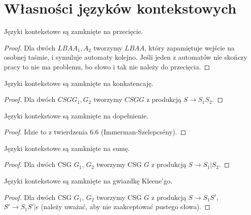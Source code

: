 \section{Własności języków kontekstowych}

\begin{lemma}
	Języki kontekstowe są zamknięte na przecięcie.
\end{lemma}

\begin{proof}
	Dla dwóch \( LBA A_1, A_2\) tworzymy \(LBA A\), który zapamiętuje wejście na osobnej taśmie, i symuluje automaty kolejno.
	Jeśli jeden z automatów nie skończy pracy to nie ma problemu, bo słowo i tak nie należy do przecięcia.
\end{proof}

\begin{lemma}
	Języki kontekstowe są zamknięte na konkatencaję.
\end{lemma}

\begin{proof}
	Dla dwóch \(CSG G_1, G_2\) tworzymy \(CSG G\) z produkcją \(S \rightarrow S_1S_2\).
\end{proof}

\begin{lemma}
	Języki kontekstowe są zamknięte na dopełnienie.
\end{lemma}

\begin{proof}
	Idzie to z twierdzenia 6.6 (Immerman-Szelepcsény).
\end{proof}

\begin{lemma}
	Języki kontekstowe są zamknięte na sumę.
\end{lemma}

\begin{proof}
	Dla dwóch CSG \(G_1\), \(G_2\) tworzymy CSG \(G\) z produkcją \(S \rightarrow S_1|S_2\).
\end{proof}

\begin{lemma}
	Języki kontekstowe są zamknięte na gwiazdkę Kleene'go.
\end{lemma}

\begin{proof}
	Dla dwóch CSG \(G_1\), \(G_2\) tworzymy CSG \(G\) z produkcją \(S \rightarrow S_1S'\), \(S' \rightarrow S_1S'|\epsilon\) (należy uważać, aby nie zaakceptować pustego słowa).
\end{proof}